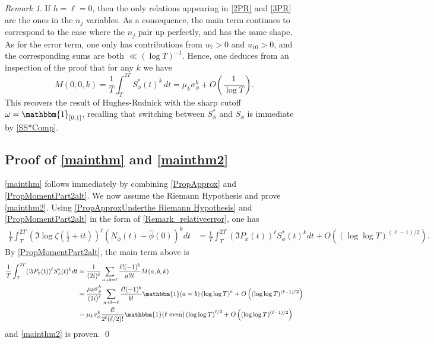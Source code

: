 \documentclass[12pt,oneside,english,a4paper]{amsart}
\theoremstyle{remark}
\newtheorem{rem}[thm]{Remark}
\numberwithin{equation}{section}
\newcommand{\Starphi}{S_\phi^*}
\begin{document}
\begin{rem}\label{RemarkHRsharp}
    If $h = \ell = 0$, then the only relations appearing in \eqref{2PR} and \eqref{3PR} are the ones in the $n_j$ variables. As a consequence, the main term continues to correspond to the case where the $n_j$ pair up perfectly, and has the same shape. As for the error term, one only has contributions from $u_7 > 0$ and $u_{10} > 0$, and the corresponding sums are both $\ll (\log T)^{-1}$. Hence, one deduces from an inspection of the proof that for any $k$ we have
    \begin{equation}
        M(0,0,k) = \frac{1}{T} \int_T^{2 T} S_\phi^*(t)^k \, dt = \mu_k \sigma_\phi^k + O \left( \frac{1}{\log T} \right). 
    \end{equation}
    This recovers the result of Hughes-Rudnick \cite{HughesRudnick} with the sharp cutoff $\omega = \mathbbm{1}_{[0,1]}$, recalling that switching between $S_\phi^*$ and $S_\phi$ is immediate by \eqref{SS*Comp}.
\end{rem}








\subsection*{Proof of \texorpdfstring{\cref{mainthm}}{mainthm} and \texorpdfstring{\cref{mainthm2}}{mainthm2} }

\cref{mainthm} follows immediately by combining \cref{PropApprox} and \cref{PropMomentPart2alt}. We now assume the Riemann Hypothesis and prove \cref{mainthm2}. Using \cref{PropApproxUnderthe Riemann Hypothesis} and \cref{PropMomentPart2alt} in the form of \cref{Remark_relativeerror}, one has
\begin{align*}
    \frac{1}{T} \int_T^{2T} (\Im\log\zeta(\tfrac{1}{2}+it))^\ell (N_\phi(t)-\hat\phi(0))^k dt 
        &= \frac{1}{T}\int_T^{2T} (\Im P_x(t))^\ell \Starphi(t)^k dt 
        +O\left( (\log\log T)^{(\ell-1)/2} \right).
\end{align*}
By \cref{PropMomentPart2alt}, the main term above is
\begin{align*}
    \frac{1}{T}\int_T^{2T} (\Im P_x(t))^\ell \Starphi(t)^k dt 
    &= \frac{1}{(2i)^\ell} \sum_{a+b=\ell} \frac{\ell! (-1)^b}{a! b!} M(a,b,k) \\
    &= \frac{\mu_k \sigma_\phi^k}{(2i)^\ell} \sum_{a+b=\ell} \frac{\ell! (-1)^b}{b!}  \mathbbm{1}(a = b) \left(\log\log T\right)^{a} + O \left( (\log\log T)^{(\ell -1)/2} \right) \\
    &= \mu_k \sigma_\phi^k \frac{\ell!}{2^\ell(\ell/2)!}  \mathbbm{1}(\ell \text{ even})  \left(\log\log T\right)^{\ell/2} + O \left( (\log\log T)^{(\ell -1)/2} \right) 
\end{align*}
and \cref{mainthm2} is proven.
\qed
\end{document}

